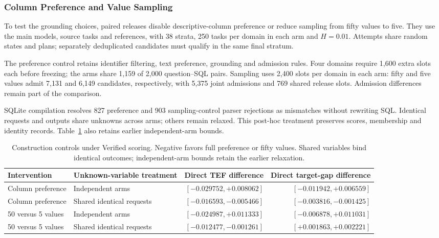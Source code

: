 \subsubsection{Column Preference and Value Sampling}\label{sec:ablation}
To test the grounding choices, paired releases disable descriptive-column preference or reduce sampling from fifty values to five. They use the main models, source tasks and references, with 38 strata, 250 tasks per domain in each arm and $H=0.01$. Attempts share random states and plans; separately deduplicated candidates must qualify in the same final stratum.

The preference control retains identifier filtering, text preference, grounding and admission rules. Four domains require 1,600 extra slots each before freezing; the arms share 1,159 of 2,000 question--SQL pairs. Sampling uses 2,400 slots per domain in each arm: fifty and five values admit 7,131 and 6,149 candidates, respectively, with 5,375 joint admissions and 769 shared release slots. Admission differences remain part of the comparison.

SQLite compilation resolves 827 preference and 903 sampling-control parser rejections as mismatches without rewriting SQL. Identical requests and outputs share unknowns across arms; others remain relaxed. This post-hoc treatment preserves scores, membership and identity records. Table~\ref{tab:ablation-layers} also retains earlier independent-arm bounds.

\begin{table}[t]\centering\small
\caption{Construction controls under Verified scoring. Negative favors full preference or fifty values. Shared variables bind identical outcomes; independent-arm bounds retain the earlier relaxation.}
\label{tab:ablation-layers}
\begin{tabular}{llrr}\toprule
Intervention & Unknown-variable treatment & Direct TEF difference & Direct target-gap difference\\\midrule
Column preference & Independent arms & $[-0.029752,+0.008062]$ & $[-0.011942,+0.006559]$\\
Column preference & Shared identical requests & $\boldsymbol{[-0.016593,-0.005466]}$ & $\boldsymbol{[-0.003816,-0.001425]}$\\
50 versus 5 values & Independent arms & $[-0.024987,+0.011333]$ & $[-0.006878,+0.011031]$\\
50 versus 5 values & Shared identical requests & $\boldsymbol{[-0.012477,-0.001261]}$ & $[+0.001863,+0.002221]$\\\bottomrule
\end{tabular}\end{table}

